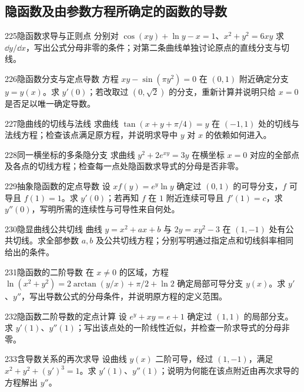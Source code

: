 \subsection{隐函数及由参数方程所确定的函数的导数}
\begin{exercise}{225}{隐函数求导与正则点}
分别对 $\cos(xy)+\ln y-x=1$、$x^2+y^2=6xy$ 求 $\dd y/\dd x$，写出公式分母非零的条件；对第二条曲线单独讨论原点的直线分支与切线。
\end{exercise}
\begin{exercise}{226}{隐函数分支与定点导数}
方程 $xy-\sin(\pi y^2)=0$ 在 $(0,1)$ 附近确定分支 $y=y(x)$。求 $y'(0)$；若改取过 $(0,\sqrt2)$ 的分支，重新计算并说明只给 $x=0$ 是否足以唯一确定导数。
\end{exercise}
\begin{exercise}{227}{隐曲线的切线与法线}
求曲线 $\tan(x+y+\pi/4)=y$ 在 $(-1,1)$ 处的切线与法线方程；检查该点满足原方程，并说明求导中 $y$ 对 $x$ 的依赖如何进入。
\end{exercise}
\begin{exercise}{228}{同一横坐标的多条隐分支}
求曲线 $y^2+2e^{xy}=3y$ 在横坐标 $x=0$ 对应的全部点及各点的切线方程；检查每一点处隐函数求导式的分母是否非零。
\end{exercise}
\begin{exercise}{229}{抽象隐函数的定点导数}
设 $xf(y)=e^y\ln y$ 确定过 $(0,1)$ 的可导分支，$f$ 可导且 $f(1)=1$。求 $y'(0)$；若再知 $f$ 在 $1$ 附近连续可导且 $f'(1)=c$，求 $y''(0)$，写明所需的连续性与可导性来自何处。
\end{exercise}
\begin{exercise}{230}{隐显曲线公共切线}
曲线 $y=x^2+ax+b$ 与 $2y=xy^2-3$ 在 $(1,-1)$ 处有公共切线。求全部参数 $a,b$ 及公共切线方程；分别写明通过指定点和切线斜率相同给出的条件。
\end{exercise}
\begin{exercise}{231}{隐函数的二阶导数}
在 $x\ne0$ 的区域，方程 $\ln(x^2+y^2)=2\arctan(y/x)+\pi/2+\ln2$ 确定局部可导分支 $y(x)$。求 $y'$、$y''$，写出导数公式的分母条件，并说明原方程的定义范围。
\end{exercise}
\begin{exercise}{232}{隐函数二阶导数的定点计算}
设 $e^y+xy=e+1$ 确定过 $(1,1)$ 的局部分支。求 $y'(1)$、$y''(1)$；写出该点处的一阶线性近似，并检查一阶求导式的分母非零。
\end{exercise}
\begin{exercise}{233}{含导数关系的再次求导}
设曲线 $y(x)$ 二阶可导，经过 $(1,-1)$，满足 $x^2+y^2+(y')^3=1$。求 $y'(1)$、$y''(1)$；说明为何能在该点附近由再次求导的方程解出 $y''$。
\end{exercise}
